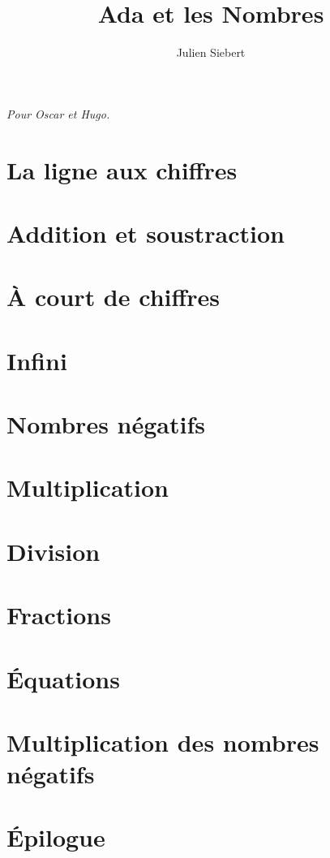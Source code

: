 \documentclass[a5paper,11pt,onecolumn]{book}
\title{Ada et les Nombres}
\author{Julien Siebert}
\begin{document}
\maketitle
\textit{Pour Oscar et Hugo.}
\chapter{La ligne aux chiffres}

\chapter[]{Addition et soustraction}

\chapter[]{À court de chiffres}

\chapter[]{Infini}

\chapter[]{Nombres négatifs}

\chapter[]{Multiplication}

\chapter[]{Division}

\chapter[]{Fractions}

\chapter[]{Équations}

\chapter[]{Multiplication des nombres négatifs}

\chapter[]{Épilogue}

\end{document}

